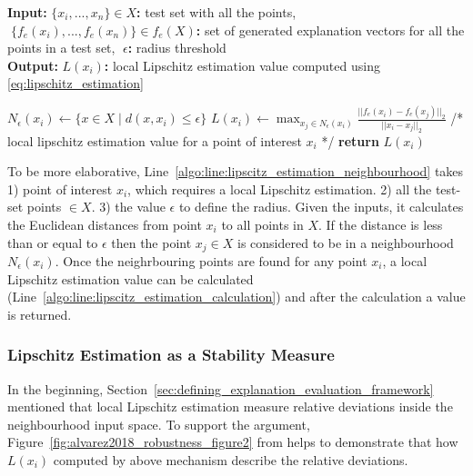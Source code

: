 \documentclass[english]{tktltiki2}
\theoremstyle{definition}
\theoremstyle{remark}
\newcommand{\multicommentsymbolstart}{/*}
\newcommand{\multicommentsymbolend}{*/}
\newcommand{\MultiLineComment}[2][\algorithmicindent]{\Statex \hspace{#1}\multicommentsymbolstart{} #2 \multicommentsymbolend{}}
\newcommand{\onespace}{\;}
\begin{document}
\begin{algorithm}[H]
	\caption{$LipschitzEstimations(X,\onespace f_e(X),\onespace \epsilon)$}
	\label{algo:lipscitz_estimation}
	\hspace*{\algorithmicindent} \textbf{Input}\textbf{:} $\{x_i,...,x_n\} \in X$\textbf{:} test set with all the points, $\onespace \{f_e(x_i),...,f_e(x_n)\} \in f_e(X)$\textbf{:} set of generated explanation vectors for all the points in a test set, $\onespace \epsilon$\textbf{:} radius threshold \\
	\hspace*{\algorithmicindent} \textbf{Output}\textbf{:} $L(x_i)$\textbf{:} local Lipschitz estimation value computed using \eqref{eq:lipschitz_estimation}
	\begin{algorithmic}[1]
		\State \label{algo:line:lipscitz_estimation_neighbourhood} $N_\epsilon(x_i)\leftarrow \{x\in X\mid d(x,x_i)\le \epsilon\}$ \Comment {\eqref{eq:neighbourhood}}
		\State \label{algo:line:lipscitz_estimation_calculation} $L(x_i) \gets \operatorname*{max}_{x_j \in N_\epsilon(x_i)} \frac{||f_e(x_i) - f_e(x_j)||_2}{||x_i - x_j||_2}$ \Comment {\eqref{eq:lipschitz_estimation}}
		\EndFor
		\MultiLineComment[0\dimexpr\algorithmicindent]{local lipschitz estimation value for a point of interest $x_i$}
		\State \textbf{return} $L(x_i)$
	\end{algorithmic}
\end{algorithm}

To be more elaborative, Line~\ref{algo:line:lipscitz_estimation_neighbourhood}
takes 1)  point of interest $x_i$, which requires a local Lipschitz estimation. 2) all the test-set points $ \in X$. 3) the value $\epsilon$ to define the radius. Given the inputs, it calculates the Euclidean distances from point $x_i$ to all points in $X$. If the distance is less than or equal to $\epsilon$ then the point $x_j \in X$ is considered to be in a neighbourhood $N_{\epsilon}(x_i)$. Once the neighrbouring points are found for any point $x_i$, a local Lipschitz estimation value can be calculated (Line~\ref{algo:line:lipscitz_estimation_calculation}) and after the calculation a value is returned.

\subsubsection{Lipschitz Estimation as a Stability Measure}\label{sec:lipschitz_estimation_as_a_stabilitys_measure} %
In the beginning, Section~\ref{sec:defining_explanation_evaluation_framework} mentioned that local Lipschitz estimation measure relative deviations inside the neighbourhood input space. To support the argument, Figure~\ref{fig:alvarez2018_robustness_figure2} from \citep{alvarez2018robustness} helps to demonstrate that how $L(x_i)$ computed by above mechanism describe the relative deviations.
\end{document}
